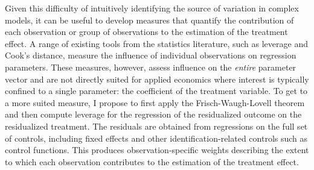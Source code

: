 \documentclass[usletter, 12pt]{article}
\begin{document}
				Given this difficulty of intuitively identifying the source of variation in complex models, it can be useful to develop measures that quantify the contribution of each observation or group of observations to the estimation of the treatment effect. A range of existing tools from the statistics literature, such as leverage and Cook’s distance, measure the influence of individual observations on regression parameters. These measures, however, assess influence on the \textit{entire} parameter vector and are not directly suited for applied economics where interest is typically confined to a single parameter: the coefficient of the treatment variable. To get to a more suited measure, I propose to first apply the Frisch-Waugh-Lovell theorem and then compute leverage for the regression of the residualized outcome on the residualized treatment. The residuals are obtained from regressions on the full set of controls, including fixed effects and other identification-related controls such as control functions. This produces observation-specific weights describing the extent to which each observation contributes to the estimation of the treatment effect. 
			
\end{document}
